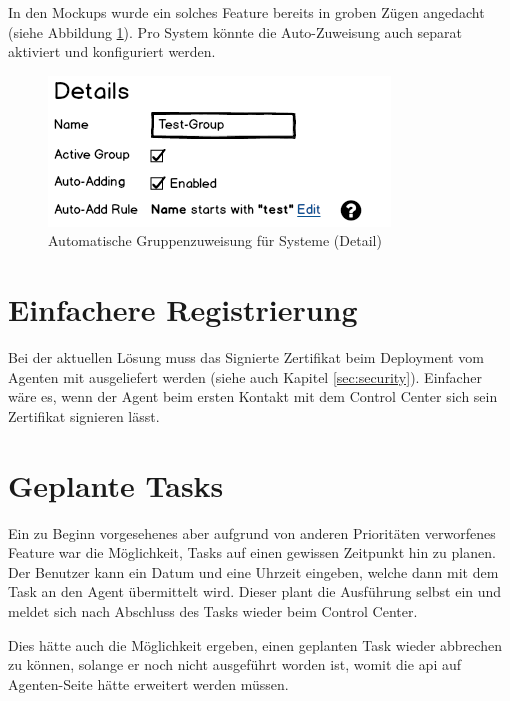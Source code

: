 In den Mockups wurde ein solches Feature bereits in groben Zügen angedacht (siehe Abbildung \ref{fig:ergebnis:group_systems_detail}). Pro System könnte die Auto-Zuweisung auch separat aktiviert und konfiguriert werden.

\begin{figure}
    \centering
    \includegraphics{files/mockups/group_systems_detail}
    \caption{Automatische Gruppenzuweisung für Systeme (Detail)}
    \label{fig:ergebnis:group_systems_detail}
\end{figure}

\section{Einfachere Registrierung}
\label{sec:ausblick:simple_registration}

Bei der aktuellen Lösung muss das Signierte Zertifikat beim Deployment vom Agenten mit ausgeliefert werden (siehe auch Kapitel \ref{sec:security}). Einfacher wäre es, wenn der Agent beim ersten Kontakt mit dem Control Center sich sein Zertifikat signieren lässt.

\xxx[ korrekt? ]

\section{Geplante Tasks}
\label{sec:ausblick:scheduled_tasks}

Ein zu Beginn vorgesehenes aber aufgrund von anderen Prioritäten verworfenes Feature war die Möglichkeit, Tasks auf einen gewissen Zeitpunkt hin zu planen. Der Benutzer kann ein Datum und eine Uhrzeit eingeben, welche dann mit dem Task an den Agent übermittelt wird. Dieser plant die Ausführung selbst ein und meldet sich nach Abschluss des Tasks wieder beim Control Center.

Dies hätte auch die Möglichkeit ergeben, einen geplanten Task wieder abbrechen zu können, solange er noch nicht ausgeführt worden ist, womit die \gls{api} auf Agenten-Seite hätte erweitert werden müssen.

